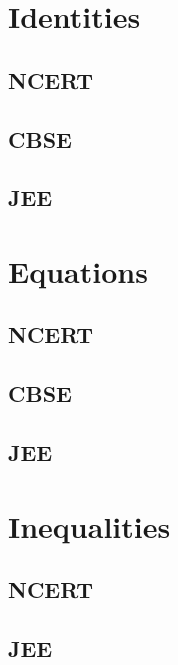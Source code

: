 \documentclass[journal]{IEEEtran}
\begin{document}
\section{Identities}
\subsection{NCERT}
 
\subsection{CBSE}
 
\subsection{JEE}
 
\section{Equations}
\subsection{NCERT}
 
\subsection{CBSE}
 
\subsection{JEE}
 
\section{Inequalities}
\subsection{NCERT}

\subsection{JEE}

\fi
\end{document}
